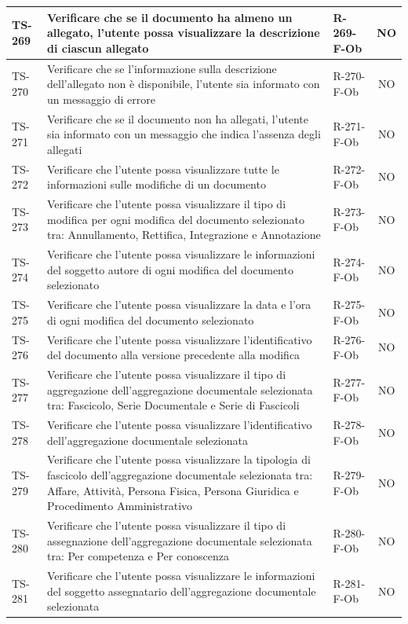 \documentclass[a4paper,12pt]{article}
\begin{document}
\begin{longtable}{|p{1.5cm}|p{8.3cm}|p{2.4cm}|c|}
\hline
TS-269 & Verificare che se il documento ha almeno un allegato, l'utente possa visualizzare la descrizione di ciascun allegato & R-269-F-Ob & NO \\
\hline
TS-270 & Verificare che se l'informazione sulla descrizione dell'allegato non è disponibile, l'utente sia informato con un messaggio di errore & R-270-F-Ob & NO \\
\hline
TS-271 & Verificare che se il documento non ha allegati, l'utente sia informato con un messaggio che indica l'assenza degli allegati & R-271-F-Ob & NO \\
\hline
TS-272 & Verificare che l'utente possa visualizzare tutte le informazioni sulle modifiche di un documento & R-272-F-Ob & NO \\
\hline
TS-273 & Verificare che l'utente possa visualizzare il tipo di modifica per ogni modifica del documento selezionato tra: Annullamento, Rettifica, Integrazione e Annotazione & R-273-F-Ob & NO \\
\hline
TS-274 & Verificare che l'utente possa visualizzare le informazioni del soggetto autore di ogni modifica del documento selezionato & R-274-F-Ob & NO \\
\hline
TS-275 & Verificare che l'utente possa visualizzare la data e l'ora di ogni modifica del documento selezionato & R-275-F-Ob & NO \\
\hline
TS-276 & Verificare che l'utente possa visualizzare l'identificativo del documento alla versione precedente alla modifica & R-276-F-Ob & NO \\
\hline
TS-277 & Verificare che l'utente possa visualizzare il tipo di aggregazione dell'aggregazione documentale selezionata tra: Fascicolo, Serie Documentale e Serie di Fascicoli & R-277-F-Ob & NO \\
\hline
TS-278 & Verificare che l'utente possa visualizzare l'identificativo dell'aggregazione documentale selezionata & R-278-F-Ob & NO \\
\hline
TS-279 & Verificare che l'utente possa visualizzare la tipologia di fascicolo dell'aggregazione documentale selezionata tra: Affare, Attività, Persona Fisica, Persona Giuridica e Procedimento Amministrativo & R-279-F-Ob & NO \\
\hline
TS-280 & Verificare che l'utente possa visualizzare il tipo di assegnazione dell'aggregazione documentale selezionata tra: Per competenza e Per conoscenza & R-280-F-Ob & NO \\
\hline
TS-281 & Verificare che l'utente possa visualizzare le informazioni del soggetto assegnatario dell'aggregazione documentale selezionata & R-281-F-Ob & NO \\

\end{longtable}
\end{document}
